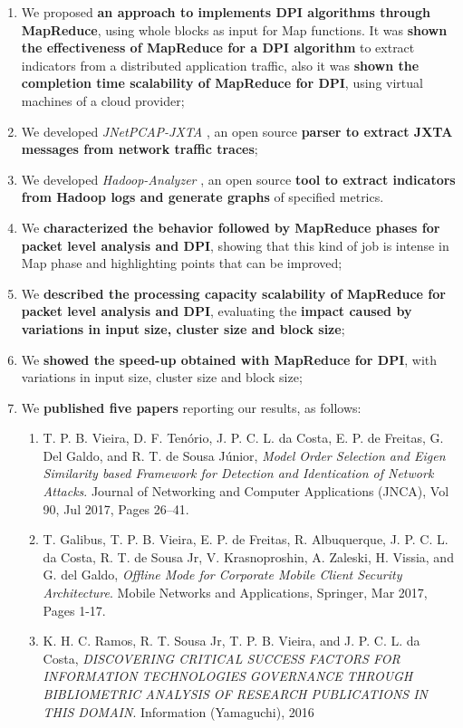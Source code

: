 \begin{enumerate}
	\item We proposed \textbf{an approach to implements DPI algorithms through MapReduce}, using whole blocks as input for Map functions. It was \textbf{shown the effectiveness of MapReduce for a DPI algorithm} to extract indicators from a distributed application traffic, also it was \textbf{shown the completion time scalability of MapReduce for DPI}, using virtual machines of a cloud provider;
	\item We developed \textit{JNetPCAP-JXTA} \citep{jnetpcapjxta}, an open source \textbf{parser to extract JXTA messages from network traffic traces};
	\item We developed \textit{Hadoop-Analyzer} \citep{Hadoopanalyzer}, an open source \textbf{tool to extract indicators from Hadoop logs and generate graphs} of specified metrics.
	\item We \textbf{characterized the behavior followed by MapReduce phases for packet level analysis and DPI}, showing that this kind of job is intense in Map phase and highlighting points that can be improved;
	\item We \textbf{described the processing capacity scalability of MapReduce for packet level analysis and DPI}, evaluating the \textbf{impact caused by variations in input size, cluster size and block size};
	\item We \textbf{showed the speed-up obtained with MapReduce for DPI}, with variations in input size, cluster size and block size;
	\item We \textbf{published five papers} reporting our results, as follows:
	\begin{enumerate}
		\item T. P. B. Vieira, D. F. Ten\'orio, J. P. C. L. da Costa, E. P. de Freitas, G. Del Galdo, and R. T. de Sousa J\'unior, \textit{Model Order Selection and Eigen Similarity based Framework for Detection and Identication of Network Attacks}. Journal of Networking and Computer Applications (JNCA), Vol 90, Jul 2017, Pages 26–41.
		\item T. Galibus, T. P. B. Vieira, E. P. de Freitas, R. Albuquerque, J. P. C. L. da Costa, R. T. de Sousa Jr, V. Krasnoproshin, A. Zaleski, H. Vissia, and G. del Galdo, \textit{Offline Mode for Corporate Mobile Client Security Architecture}. Mobile Networks and Applications, Springer, Mar 2017, Pages 1-17.
		\item K. H. C. Ramos, R. T. Sousa Jr, T. P. B. Vieira, and J. P. C. L. da Costa, \textit{DISCOVERING CRITICAL SUCCESS FACTORS FOR INFORMATION TECHNOLOGIES GOVERNANCE THROUGH BIBLIOMETRIC ANALYSIS OF RESEARCH PUBLICATIONS IN THIS DOMAIN}. Information (Yamaguchi), 2016

\end{enumerate}
\end{enumerate}
